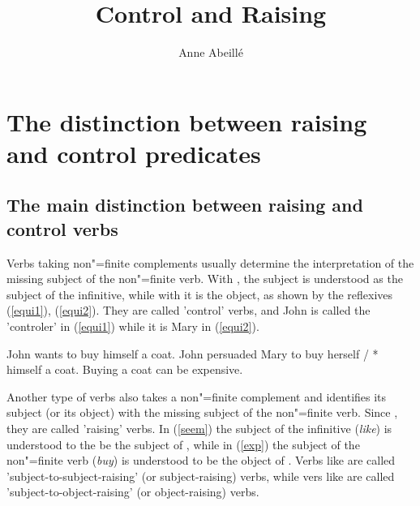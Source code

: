 \documentclass[output=paper
	        ,collection
	        ,collectionchapter
 	        ,biblatex
                ,babelshorthands
                ,newtxmath
                ,draftmode
                ,colorlinks, citecolor=brown
]{./langsci/langscibook}
\author{%
	Anne Abeillé\affiliation{Université de Paris}%
}
\title{Control and Raising}
\begin{document}
\maketitle
\label{chap-control-raising}



\section{The distinction between raising and control predicates}

\subsection{The main distinction between raising and control verbs}

Verbs taking non"=finite complements usually determine the interpretation of the missing subject of the non"=finite verb. With , the subject is understood as the subject of the infinitive, while with  it is the object, as shown by the reflexives (\ref{equi1}), (\ref{equi2}). They are called 'control' verbs, and John is called the 'controler' in (\ref{equi1}) while it is Mary in (\ref{equi2}).

	\begin{exe}
	\ex \begin{xlist}
	\ex John wants to buy himself a coat. \label{equi1}
   \ex 	John persuaded Mary to buy herself / * himself a coat.\label{equi2}
 \ex Buying a coat can be expensive.\label{arbitrary}
 \end{xlist}
 \end{exe}


Another type of verbs also takes a non"=finite complement and identifies its subject (or its object) with the missing subject of the non"=finite verb. Since \citet{Postal1974}, they are called 'raising' verbs. In (\ref{seem}) the subject of the infinitive (\emph{like}) is understood to the be the subject of , while in (\ref{exp}) the subject of the non"=finite verb (\emph{buy}) is understood to be the object of . Verbs like  are called 'subject-to-subject-raising' (or subject-raising) verbs, while
vers like  are called 'subject-to-object-raising' (or object-raising) verbs.
\end{document}
